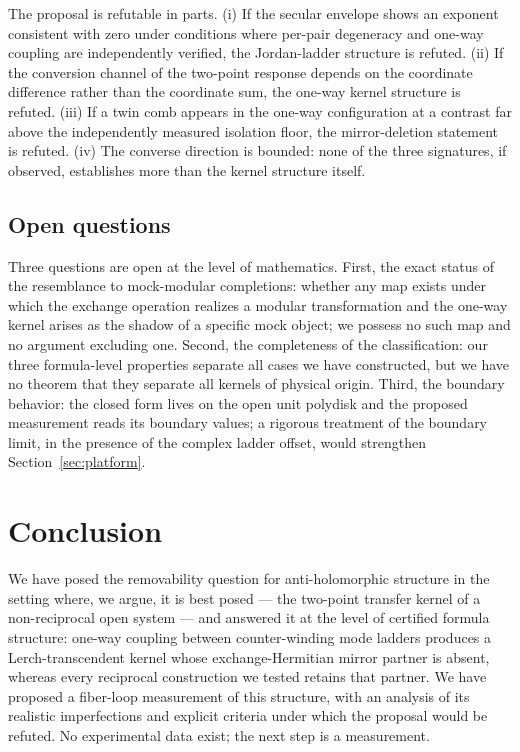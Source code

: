 \documentclass[11pt,a4paper]{article}
\begin{document}
The proposal is refutable in parts. (i) If the secular envelope shows an
exponent consistent with zero under conditions where per-pair degeneracy and
one-way coupling are independently verified, the Jordan-ladder structure is
refuted. (ii) If the conversion channel of the two-point response depends on
the coordinate difference rather than the coordinate sum, the one-way kernel
structure is refuted. (iii) If a twin comb appears in the one-way configuration
at a contrast far above the independently measured isolation floor, the
mirror-deletion statement is refuted. (iv) The converse direction is bounded:
none of the three signatures, if observed, establishes more than the kernel
structure itself.

\subsection{Open questions}

Three questions are open at the level of mathematics. First, the exact status
of the resemblance to mock-modular completions: whether any map exists under
which the exchange operation realizes a modular transformation and the one-way
kernel arises as the shadow of a specific mock object; we possess no such map
and no argument excluding one. Second, the completeness of the classification:
our three formula-level properties separate all cases we have constructed, but
we have no theorem that they separate all kernels of physical origin. Third,
the boundary behavior: the closed form lives on the open unit polydisk and the
proposed measurement reads its boundary values; a rigorous treatment of the
boundary limit, in the presence of the complex ladder offset, would strengthen
Section~\ref{sec:platform}.

\section{Conclusion}

We have posed the removability question for anti-holomorphic structure in the
setting where, we argue, it is best posed --- the two-point transfer kernel of
a non-reciprocal open system --- and answered it at the level of certified
formula structure: one-way coupling between counter-winding mode ladders
produces a Lerch-transcendent kernel whose exchange-Hermitian mirror partner is
absent, whereas every reciprocal construction we tested retains that partner.
We have proposed a fiber-loop measurement of this structure, with an analysis
of its realistic imperfections and explicit criteria under which the proposal
would be refuted. No experimental data exist; the next step is a measurement.
\end{document}
